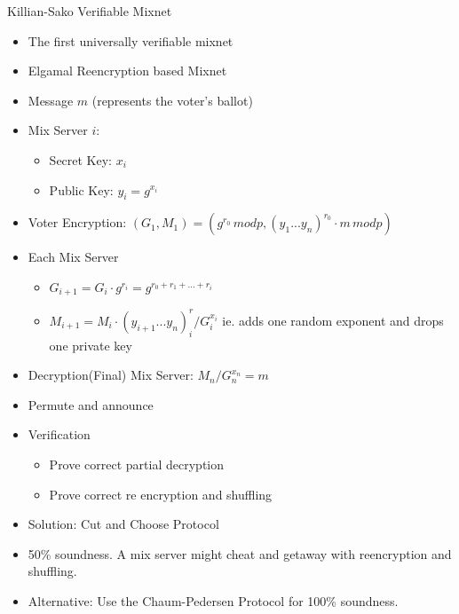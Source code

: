 \documentclass{beamer}
\begin{document}
\begin{frame}[allowframebreaks]{Killian-Sako Verifiable Mixnet \cite{SK95}}
\begin{itemize}
\item The first universally verifiable mixnet
\item Elgamal Reencryption based Mixnet \cite{PIK93}
\item Message $m$ (represents the voter's ballot)
\item Mix Server $i$:
\begin{itemize} 
	\item Secret Key: $x_i$
	\item Public Key: $y_i = g^{x_i}$
\end{itemize}
\item Voter Encryption: $(G_1,M_1) = (g^{r_0} \, mod p , (y_1 ... y_n)^{r_0} \cdot m \, mod p)$
\item Each Mix Server
\begin{itemize} 
	\item $G_{i+1} = G_i \cdot g^{r_i} = g^{r_0+r_1+...+r_i}$
	\item $M_{i+1} = M_i \cdot (y_{i+1} ... y_n)^r_i / G_{i}^{x_i}$ ie. adds one random exponent and drops one private key
\end{itemize}
\item Decryption(Final) Mix Server: $M_n / G_n^{x_n} = m$	
\item Permute and announce 
\end{itemize}

\framebreak

\begin{itemize}
\item Verification
\begin{itemize}
	\item Prove correct partial decryption
	\item Prove correct re encryption and shuffling
\end{itemize}
\item Solution: Cut and Choose Protocol
\item 50\% soundness. A mix server might cheat and getaway with reencryption and shuffling.
\item Alternative: Use the Chaum-Pedersen Protocol for 100\% soundness.
\end{itemize}


\end{frame}
\end{document}
